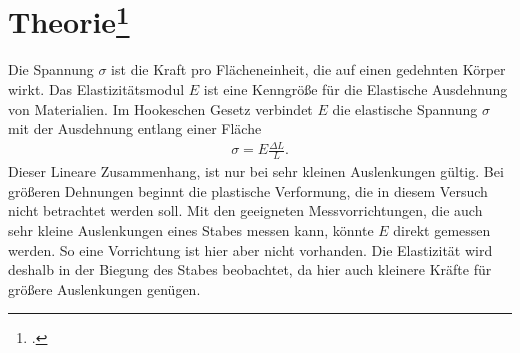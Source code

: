 \section[Theorie]{Theorie\footcite{man:v103}}
Die Spannung $\sigma$ ist die Kraft pro Flächeneinheit, die auf einen gedehnten Körper wirkt.
Das Elastizitätsmodul $E$ ist eine Kenngröße für die Elastische Ausdehnung von Materialien. %
Im Hookeschen Gesetz verbindet $E$ die elastische Spannung $\sigma$ mit der Ausdehnung entlang einer Fläche
\begin{align}
    \sigma = E \frac{\Delta L}{L}.
    \label{eq:Hook_Gesetz}
\end{align}
\noindent
Dieser Lineare Zusammenhang, ist nur bei sehr kleinen Auslenkungen gültig.
Bei größeren Dehnungen beginnt die plastische Verformung, die in diesem Versuch nicht betrachtet werden soll.
Mit den geeigneten Messvorrichtungen, die auch sehr kleine Auslenkungen eines Stabes messen kann, 
könnte $E$ direkt gemessen werden.
So eine Vorrichtung ist hier aber nicht vorhanden. 
Die Elastizität wird deshalb in der Biegung des Stabes beobachtet, da hier auch kleinere Kräfte für größere Auslenkungen genügen.

